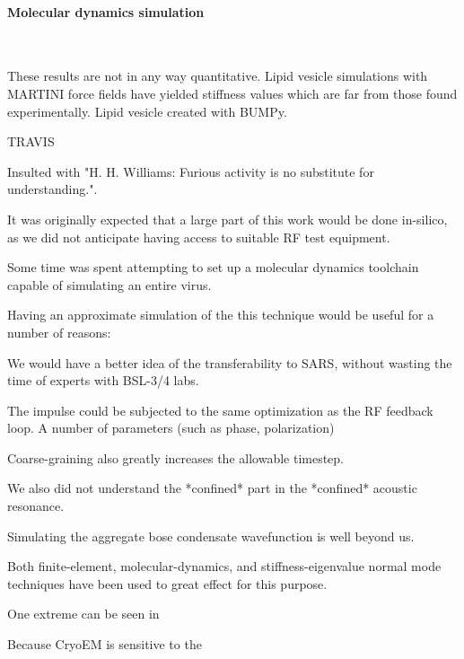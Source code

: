 \documentclass[paper.tex]{subfiles}
\begin{document}
\paragraph{Molecular dynamics simulation}
\


These results are not in any way quantitative. Lipid vesicle simulations with MARTINI force fields 
have yielded stiffness values which are far from those found experimentally. Lipid vesicle created 
with BUMPy. 

TRAVIS

Insulted with "H. H. Williams: Furious activity is no substitute 
for understanding.".








It was originally expected that a large part of this work would be done in-silico, as we did not anticipate having access to suitable RF test equipment. 

Some time was spent attempting to set up a molecular dynamics toolchain capable of simulating an entire virus. 

Having an approximate simulation of the this technique would be useful for a number of reasons: 

We would have a better idea of the transferability to SARS, without wasting the time of experts with BSL-3/4 labs.

The impulse could be subjected to the same optimization as the RF feedback loop. A number of parameters (such as phase, polarization)



Coarse-graining also greatly increases the allowable timestep.

We also did not understand the *confined* part in the *confined* acoustic resonance.

Simulating the aggregate bose condensate wavefunction is well beyond us.


Both finite-element, molecular-dynamics, and stiffness-eigenvalue normal mode techniques have been used to great effect for this purpose. 








One extreme can be seen in 

Because CryoEM is sensitive to the 
\end{document}
